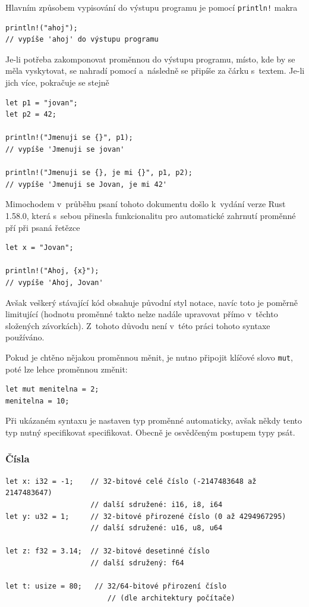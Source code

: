 \documentclass[a4paper, 12pt, twoside]{article} %
\newcommand{\rust}[1]{\texttt{#1}}
\begin{document}
		Hlavním způsobem vypisování do výstupu programu je pomocí \rust{println!} makra
		\begin{verbatim}
println!("ahoj");
// vypíše 'ahoj' do výstupu programu
		\end{verbatim}
		
		Je-li potřeba zakomponovat proměnnou do výstupu programu, místo, kde by se měla vyskytovat, se nahradí pomocí \rust{{}} a~následně se připíše za čárku s~textem. Je-li jich více, pokračuje se stejně
		\begin{verbatim}
let p1 = "jovan";
let p2 = 42;

println!("Jmenuji se {}", p1);
// vypíše 'Jmenuji se jovan'

println!("Jmenuji se {}, je mi {}", p1, p2);
// vypíše 'Jmenuji se Jovan, je mi 42'
		\end{verbatim}
		
		Mimochodem v~průběhu psaní tohoto dokumentu došlo k~vydání verze Rust 1.58.0, která s~sebou přinesla funkcionalitu pro automatické zahrnutí proměnné pří při psaná řetězce
		\begin{verbatim}
let x = "Jovan";

println!("Ahoj, {x}");
// vypíše 'Ahoj, Jovan'
		\end{verbatim}
		\cite{rustblog_ann}
		
		Avšak veškerý stávající kód obsahuje původní styl notace, navíc toto je poměrně limitující (hodnotu proměnné takto nelze nadále upravovat přímo v~těchto složených závorkách). Z~tohoto důvodu není v~této práci tohoto syntaxe používáno.
		
		Pokud je chtěno nějakou proměnnou měnit, je nutno připojit klíčové slovo \rust{mut}, poté lze lehce proměnnou změnit:
		\begin{verbatim}
let mut menitelna = 2;
menitelna = 10;
		\end{verbatim}

		Při ukázaném syntaxu je nastaven typ proměnné automaticky, avšak někdy tento typ nutný specifikovat specifikovat. Obecně je osvědčeným postupem typy psát.


		\subsubsection*{Čísla}
			\begin{verbatim}
let x: i32 = -1;    // 32-bitové celé číslo (-2147483648 až 2147483647)
					// další sdružené: i16, i8, i64
let y: u32 = 1;     // 32-bitové přirozené číslo (0 až 4294967295)
					// další sdružené: u16, u8, u64                

let z: f32 = 3.14;  // 32-bitové desetinné číslo 
					// další sdružený: f64

let t: usize = 80;   // 32/64-bitové přirození číslo
						// (dle architektury počítače)
			\end{verbatim}
\end{document}
